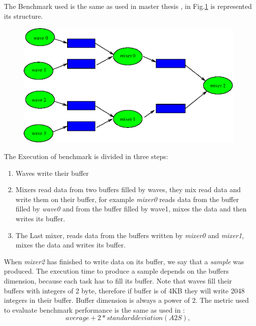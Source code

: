 The Benchmark used is the same as used in master thesis \cite{lcs}, in Fig.\ref{fig:bench} is represented its structure.

\begin{figure}[htbp]
\centering
\includegraphics[width=\widefigure]{images/bench.eps}
\caption{}
\label{fig:bench}
\end{figure}

The Execution of benchmark is divided in three steps:

\begin{enumerate}
\item Waves write their buffer
\item Mixers read data from two buffers filled by waves, they mix read data and write them on their buffer, for example \textit{mixer0} reads data 
from the buffer filled by \textit{wave0} and from the buffer filled by wave1, mixes the data and then writes its buffer.
\item The Last mixer, reads data from the buffers written by \textit{mixer0} and \textit{mixer1}, mixes the data and writes its buffer.
\end{enumerate}

When \textit{mixer2} has finished to write data on its buffer, we say that a \textit{sample} was produced. The execution time to produce a sample 
depends on the buffers dimension, because each task has to fill its buffer. Note that waves fill their buffers with integers of 2 byte, therefore if 
buffer is of 4KB they will write 2048 integers in their buffer. Buffer dimension is always a power of 2.
The metric used to evaluate benchmark performance is the same as used in \cite{lcs}: 
\begin{equation}
	average + 2*standard deviation (A2S), 
\label{eq:metric_rt}
\end{equation}

